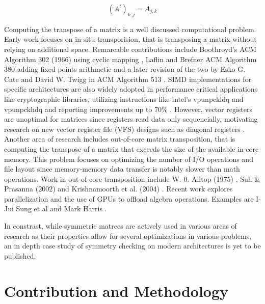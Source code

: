 \documentclass[conference]{IEEEtran}
\begin{document}
\begin{equation}
	(A^t)_{k,j} = A_{j,k}
\end{equation}

\fi

Computing the transpose of a matrix is a well discussed computational problem. Early
work focuses on in-situ transporision, that is transposing a matrix without
relying on additional space. Remarcable contributions include Boothroyd's ACM Algorithm 302 (1966) using cyclic mapping \cite{b13}, Laflin and Brefner ACM Algorithm 380
adding fixed points arithmetic \cite{b14} and
a later revision of the two by Esko G. Cate and David W. Twigg in ACM Algorithm 513 \cite{b15} .
SIMD implementations for specific architectures are also widely adopted
in performance critical applications like cryptographic libraries, utilizing instructions like Intel's vpunpckldq and vpunpckhdq \cite{b16} and reporting improvements up to 70\% \cite{b17}.
However, vector registers are unoptimal for matrices since registers read data only sequencially, motivating research on new vector register file (VFS) designs such as diagonal registers \cite{b23}.
Another area of research includes out-of-core matrix transposition, that
is computing the transpose of a matrix that exceeds the size of the available in-core memory.
This problem focuses on optimizing the number of I/O operations and file layout since memory-memory data transfer is notably slower than math operations. Work in out-of-core transposition include W. 0. Alltop (1975) \cite{b18}, Suh \& Prasanna (2002) \cite{b19} and Krishnamoorth et al. (2004) \cite{b20}.
Recent work explores parallelization and the use of GPUs to offload algebra operations. Examples are I-Jui Sung et al \cite{b21} and Mark Harris \cite{b22}.

In constrast, while symmetric matrces are actively used in various areas of research as their
properties allow for several optimizations in various problems, an in depth case study of symmetry
checking on modern architectures is yet to be published.

\section{Contribution and Methodology}

\end{document}
